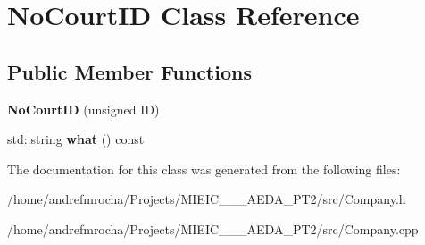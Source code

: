 \hypertarget{class_no_court_i_d}{}\section{No\+Court\+ID Class Reference}
\label{class_no_court_i_d}
\subsection*{Public Member Functions}
\begin{DoxyCompactItemize}
\item 
\mbox{\label{class_no_court_i_d_a2552f160412cb211570faee6567dcd40}} 
{\bfseries No\+Court\+ID} (unsigned ID)
\item 
\mbox{\label{class_no_court_i_d_a0ccd0b5e83d1ca41b3598bf778f1712f}} 
std\+::string {\bfseries what} () const
\end{DoxyCompactItemize}


The documentation for this class was generated from the following files\+:\begin{DoxyCompactItemize}
\item 
/home/andrefmrocha/\+Projects/\+M\+I\+E\+I\+C\+\_\+\_\+\_\+\+A\+E\+D\+A\+\_\+\+P\+T2/src/Company.\+h\item 
/home/andrefmrocha/\+Projects/\+M\+I\+E\+I\+C\+\_\+\_\+\_\+\+A\+E\+D\+A\+\_\+\+P\+T2/src/Company.\+cpp\end{DoxyCompactItemize}

